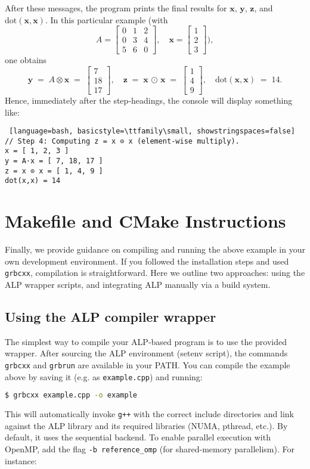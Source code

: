 After these messages, the program prints the final results for 
\(\mathbf{x}\), \(\mathbf{y}\), \(\mathbf{z}\), and \(\mathrm{dot}(\mathbf{x},\mathbf{x})\). In this particular example (with 
\[
A = 
\begin{bmatrix}
0 & 1 & 2 \\
0 & 3 & 4 \\
5 & 6 & 0
\end{bmatrix},\quad
\mathbf{x} = \begin{bmatrix}1\\2\\3\end{bmatrix}),
\]
one obtains
\[
\mathbf{y} \;=\; A \otimes \mathbf{x} \;=\; \begin{bmatrix}7\\18\\17\end{bmatrix},
\quad
\mathbf{z} \;=\; \mathbf{x} \,\odot\, \mathbf{x} \;=\; \begin{bmatrix}1\\4\\9\end{bmatrix},
\quad
\mathrm{dot}(\mathbf{x},\mathbf{x}) \;=\; 14.
\]
Hence, immediately after the step‐headings, the console will display something like:
\begin{lstlisting} [language=bash, basicstyle=\ttfamily\small, showstringspaces=false]
// Step 4: Computing z = x ⊙ x (element‐wise multiply).
x = [ 1, 2, 3 ]
y = A·x = [ 7, 18, 17 ]
z = x ⊙ x = [ 1, 4, 9 ]
dot(x,x) = 14
\end{lstlisting}


\section{Makefile and CMake Instructions}\label{sec:build_instructions}

Finally, we provide guidance on compiling and running the above example in your own development environment. If you followed the installation steps and used \texttt{grbcxx}, compilation is straightforward. Here we outline two approaches: using the ALP wrapper scripts, and integrating ALP manually via a build system.

\subsection*{Using the ALP compiler wrapper}

The simplest way to compile your ALP-based program is to use the provided wrapper. After sourcing the ALP environment (setenv script), the commands \texttt{grbcxx} and \texttt{grbrun} are available in your PATH. You can compile the example above by saving it (e.g. as \texttt{example.cpp}) and running:
\begin{lstlisting}[language=bash]
$ grbcxx example.cpp -o example
\end{lstlisting}
This will automatically invoke \texttt{g++} with the correct include directories and link against the ALP library and its required libraries (NUMA, pthread, etc.). By default, it uses the sequential backend. To enable parallel execution with OpenMP, add the flag \texttt{-b reference\_omp} (for shared-memory parallelism). For instance:


